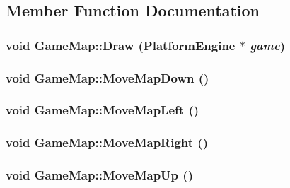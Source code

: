 \subsection{Member Function Documentation}
\hypertarget{class_game_map_c289ffedd32b98d2827e6b765b3e50d6}{
\subsubsection[{Draw}]{\setlength{\rightskip}{0pt plus 5cm}void GameMap::Draw ({\bf PlatformEngine} $\ast$ {\em game})}}
\label{class_game_map_c289ffedd32b98d2827e6b765b3e50d6}


\hypertarget{class_game_map_7466202e8f2bd3ae188ddcbd7e50a023}{
\subsubsection[{MoveMapDown}]{\setlength{\rightskip}{0pt plus 5cm}void GameMap::MoveMapDown ()}}
\label{class_game_map_7466202e8f2bd3ae188ddcbd7e50a023}


\hypertarget{class_game_map_90fe97ecdcee40995d8e5fa86857cf5c}{
\subsubsection[{MoveMapLeft}]{\setlength{\rightskip}{0pt plus 5cm}void GameMap::MoveMapLeft ()}}
\label{class_game_map_90fe97ecdcee40995d8e5fa86857cf5c}


\hypertarget{class_game_map_e76fd062e8e47331e7e999dbea0f0486}{
\subsubsection[{MoveMapRight}]{\setlength{\rightskip}{0pt plus 5cm}void GameMap::MoveMapRight ()}}
\label{class_game_map_e76fd062e8e47331e7e999dbea0f0486}


\hypertarget{class_game_map_e9b33ef01ca643a2389e7be0ebf838b1}{
\subsubsection[{MoveMapUp}]{\setlength{\rightskip}{0pt plus 5cm}void GameMap::MoveMapUp ()}}
\label{class_game_map_e9b33ef01ca643a2389e7be0ebf838b1}



